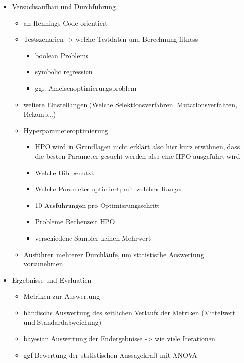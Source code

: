 \begin{itemize}
    \item Versuchsaufbau und Durchführung
    \begin{itemize}
        \item an Hennings Code orientiert
        \item Testszenarien -> welche Testdaten und Berechnung fitness
        \begin{itemize}
            \item boolean Problems
            \item symbolic regression
            \item ggf. Ameisenoptimierungsproblem
        \end{itemize}
        \item weitere Einstellungen (Welche Selektionsverfahren, Mutationsverfahren, Rekomb...)
        \item Hyperparameteroptimierung
        \begin{itemize}
        	\item HPO wird in Grundlagen nicht erklärt also hier kurz erwähnen, dass die besten Parameter gesucht werden also eine HPO ausgeführt wird
            \item Welche Bib benutzt
            \item Welche Parameter optimiert; mit welchen Ranges
            \item 10 Ausführungen pro Optimierungsschritt
            \item Probleme Rechenzeit HPO
            \item verschiedene Sampler keinen Mehrwert
        \end{itemize}
        \item Ausführen mehrerer Durchläufe, um statistische Auswertung vorzunehmen
    \end{itemize}
    \item Ergebnisse und Evaluation
    \begin{itemize}
        \item Metriken zur Auswertung
        \item händische Auswertung des zeitlichen Verlaufs der Metriken (Mittelwert und Standardabweichung)
        \item bayesian Auswertung der Endergebnisse -> wie viele Iterationen
        \item ggf Bewertung der statistischen Aussagekraft mit ANOVA
    \end{itemize}
\end{itemize}
